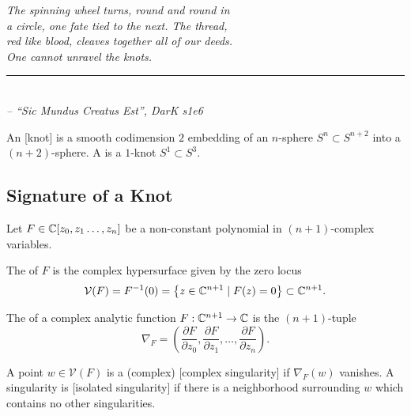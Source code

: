 \providecommand{\V}{\mathcal{V}}
\renewcommand{\L}{\mathcal{L}}

\begin{flushleft}
	\textsl{The spinning wheel turns, round and round in }\\
	\textsl{a circle, one fate tied to the next. The thread,}\\
	\textsl{red like blood, cleaves together all of our deeds.}\\
	\textsl{One cannot unravel the knots.}\\
	\rule[0pt]{21em}{0.5pt}\\
	\textsl{-- ``Sic Mundus Creatus Est'', DarK s1e6}
	\vspace{2em}
\end{flushleft}

\begin{definition}
	An [knot] is a smooth codimension $2$ embedding of an $n$-sphere $S^n\subset S^{n+2}$ into a $(n+2)$-sphere. A  is a $1$-knot $S^1\subset S^3$.
\end{definition}

\subsection*{Signature of a Knot}

Let $F\in \mathbb{C}[z_0,z_1\ldots, z_n]$ be a non-constant polynomial in $(n+1)$-complex variables.
\begin{definition}
	The  of $F$ is the complex hypersurface given by the zero locus
	\[
		\V(F) = F^{-1}(0)=\left\{ z \in \C^{n+1} \mid F(z)=0\right\} \subset \C^{n+1}.
	\]
\end{definition}


\begin{definition}
	The  of a complex analytic function $F : \mathbb{C}^{n+1} \to \mathbb{C}$ is the $(n+1)$-tuple
	\[
		\nabla_F = \left(\frac{\partial F}{\partial z_0}, \frac{\partial F}{\partial z_1},\ldots, \frac{\partial F}{\partial z_n}\right).
	\]
\end{definition}

\begin{definition}
	A point $w\in \V(F)$ is a (complex) [complex singularity] if $\nabla_F(w)$ vanishes. A singularity is [isolated singularity] if there is a neighborhood surrounding $w$ which contains no other singularities.
\end{definition}

